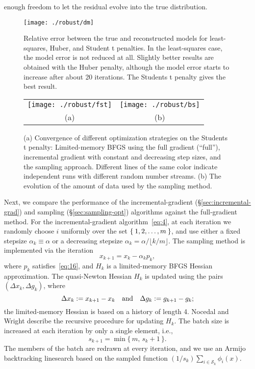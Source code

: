 \documentclass[nospthms]{svjour3}
\numberwithin{equation}{section}
\def\text #1{\hbox{\quad#1\quad}}
\def\k{_k}
\def\kp#1{_{k+#1}}
\def\Sscr{\mathcal{S}}
\def\sample{\Sscr}
\begin{document}
enough freedom to let the residual evolve into the true distribution.
\begin{figure}[t]
\centering
\texttt{[image: ./robust/dm]}
\caption{Relative error between the true and reconstructed models for
  least-squares, Huber, and Student t penalties. In the least-squares
  case, the model error is not reduced at all. Slightly better results
  are obtained with the Huber penalty, although the model error starts
  to increase after about 20 iterations.  The Students t penalty gives
  the best result.}
\label{fig:fwimodelerror}
\end{figure}
\begin{figure}[t]
\centering
\begin{tabular}{cc}
\texttt{[image: ./robust/fst]}&
\texttt{[image: ./robust/bs]}\\
{\small (a)}&
{\small (b)}\\
\end{tabular}
\caption{(a) Convergence of different optimization strategies on the
  Students t penalty: Limited-memory BFGS using the full gradient (``full''),
  incremental gradient with constant and decreasing step
  sizes, and the sampling approach.  Different lines of the same color
  indicate independent runs with different random number streams.  (b)
The evolution of the amount of data used by the sampling method.}
\label{fig:fwiconvergence}
\end{figure}

Next, we compare the performance of the incremental-gradient
(\S\ref{sec:incremental-grad}) and sampling (\S\ref{sec:sampling-opt})
algorithms against the full-gradient method.  For the
incremental-gradient algorithm~\eqref{eq:4}, at each iteration we
randomly choose $i$ uniformly over the set $\Set{1,2,\ldots,m}$, and use
either a fixed stepsize $\alpha_k \equiv \alpha$ or a decreasing
stepsize $\alpha_k = \alpha/\lfloor k/m\rfloor$. The sampling method
is implemented via the iteration
\begin{equation*}
 x_{k+1} = x_k - \alpha_k p\k,
\end{equation*}
where $p\k$ satisfies~\eqref{eq:16}, and $H\k$ is a limited-memory
BFGS Hessian approximation. The quasi-Newton Hessian $H_k$ is updated
using the pairs $(\Delta x\k,\Delta g\k)$, where
\[
\Delta x\k := x\kp1 - x\k
\text{and}
\Delta g\k := g\kp1 - g\k;
\]
the limited-memory Hessian is based on a history of length 4. Nocedal
and Wright\cite[\S7.2]{Noce} describe the recursive procedure for
updating $H\k$. The batch size is increased at each iteration by only
a single element, i.e.,
\[
s\kp1 = \min\{\, m,\,s\k + 1\,\}.
\]
The members of the batch are redrawn at every iteration, and we use an
Armijo backtracking linesearch based on the sampled function
$(1/s\k)\sum_{i\in\sample_k}\phi_i(x)$.
\end{document}
